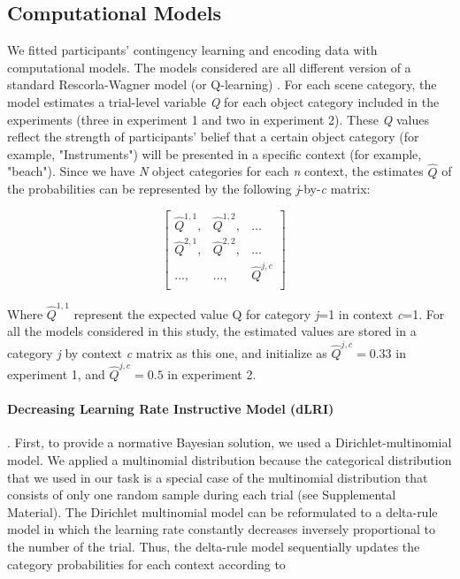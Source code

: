 \documentclass[a4paper,12pt]{article}
\begin{document}
\subsection{Computational Models}
We fitted participants' contingency learning and encoding data with computational models. The models considered are all different version of a standard Rescorla-Wagner model (or Q-learning) \citep{Sutton1998, Daw2011}. For each scene category, the model estimates a trial-level variable \textit{Q} for each object category included in the experiments (three in experiment 1 and two in experiment 2). These \textit{Q} values reflect the strength of participants' belief that a certain object category (for example, "Instruments") will be presented in a specific context (for example, "beach"). 
\noindent
Since we have \textit{N} object categories for each \textit{n} context, the estimates $\hat{Q}$ of the probabilities can be represented by the following \textit{j}-by-\textit{c} matrix:

\begin{equation}
\begin{bmatrix} 
\hat{Q}^{1,1}, & \hat{Q}^{1,2}, & ... \\
\hat{Q}^{2,1}, & \hat{Q}^{2,2}, & ...\\
..., &..., & \hat{Q}^{j,c} \\
\end{bmatrix}
\quad
\label{matrix}
\end{equation}

\noindent
Where $\hat{Q}^{1,1}$ represent the expected value Q for category \textit{j}=1 in context \textit{c}=1. For all the models considered in this study, the estimated values are stored in a category \textit{j} by context \textit{c} matrix as this one, and initialize as  $\hat{Q}^{j,c} = 0.33$ in experiment 1, and $\hat{Q}^{j,c} = 0.5$ in experiment 2.

\paragraph{Decreasing Learning Rate Instructive Model (dLRI)}. First, to provide a normative Bayesian solution, we used a Dirichlet-multinomial model. We applied a multinomial distribution because the categorical distribution that we used in our task is a special case of the multinomial distribution that consists of only one random sample during each trial (see Supplemental Material). The Dirichlet multinomial model can be reformulated to a delta-rule model in which the learning rate constantly decreases inversely proportional to the number of the trial. 
Thus, the delta-rule model sequentially updates the category probabilities for each context according to
\end{document}
